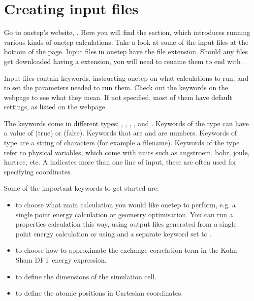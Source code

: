 \documentclass[letterpaper,10pt,english]{sphinxmanual}
\begin{document}
\section{Creating input files}
\label{\detokenize{starting_with_onetep:creating-input-files}}
Go to onetep’s website, . Here you will
find the  section, which introduces running various kinds of
onetep calculations. Take a look at some of the input files at the
bottom of the page. Input files in onetep have the  file
extension. Should any files get downloaded having a  extension,
you will need to rename them to end with .

Input files contain keywords, instructing onetep on what calculations to
run, and to set the parameters needed to run them. Check out the
keywords on the webpage
 to see what they
mean. If not specified, most of them have default settings, as listed on
the webpage.

\begin{DUlineblock}{0em}
\item[] The keywords come in different types: , ,
, ,  and . Keywords of the type
 can have a value of  (true) or  (false).
Keywords that are  and  are numbers. Keywords of
type  are a string of characters (for example a filename).
Keywords of the type  refer to physical variables, which
come with units such as angstroem, bohr, joule, hartree, etc. A
 indicates more than one line of input, these are often used
for specifying coordinates.
\item[] Some of the important keywords to get started are:
\end{DUlineblock}
\begin{itemize}
\item {} 
 \textendash{} to choose what main calculation you would like onetep to
perform, e.g. a single point energy calculation or geometry
optimisation. You can run a properties calculation this way, using
output files generated from a single point energy calculation or
using  and a separate keyword 
set to .

\item {} 
 \textendash{} to choose how to approximate the
exchange-correlation term in the Kohn Sham DFT energy expression.

\item {} 
 \textendash{} to define the dimensions of the simulation
cell.

\item {} 
 \textendash{} to define the atomic positions in
Cartesian coordinates.

\end{itemize}
\end{document}
